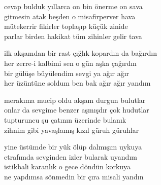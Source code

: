 \documentclass[10pt, openright, oneside]{memoir}
\theoremstyle{definition}
\begin{document}
\settowidth{\versewidth}{parlar birden hakikat tüm zihinler gelir tava}
\begin{cverse}
  cevap bulduk yıllarca on bin önerme on sava \\
  gitmesin atak beşden o misafirperver hava \\
  mütekerrir fikirler toplaşıp küçük zinide \\
  parlar birden hakikat tüm zihinler gelir tava \\
\end{cverse}
\vspace*{\fill}
%
\newpage
{}
\vspace*{\fill}
\settowidth{\versewidth}{ilk akşamdan bir rast çığlık kopardın da bağırdın}
\begin{cverse}
  ilk akşamdan bir rast çığlık kopardın da bağırdın \\
  her zerre-i kalbimi sen o gün aşka çağırdın \\
  bir gülüşe büyülendim sevgi ya ağır ağır \\
  her üzüntüne soldum ben bak ağır ağır yandım \\
\end{cverse}
\vspace*{\fill}
%
\newpage
{}
\vspace*{\fill}
\settowidth{\versewidth}{onlar da sevgime benzer aşmışdır çok hudutlar}
\begin{cverse}
  merakıma mucip oldu akşam durgun bulutlar \\
  onlar da sevgime benzer aşmışdır çok hudutlar \\
  tupturuncu şu çatının üzerinde bulanık \\
  zihnim gibi yavaşlamış kızıl güruh güruhlar \\
\end{cverse}
\vspace*{\fill}
%
\newpage
{}
\vspace*{\fill}
\settowidth{\versewidth}{ne yapdımsa sönmedin bir çıra misali yandın}
\begin{cverse}
  yine üstümde bir yük ölüp dalmışım uykuya \\
  etrafımda sevginden izler bularak uyandım \\
  istikbali karanlık o gece döndün korkuya \\
  ne yapdımsa sönmedin bir çıra misali yandın \\
\end{cverse}
\end{document}
